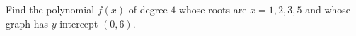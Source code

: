 Find the polynomial $f(x)$ of degree $4$ whose roots are $x=1,2,3,5$ and whose graph has $y$-intercept $(0,6)$.
